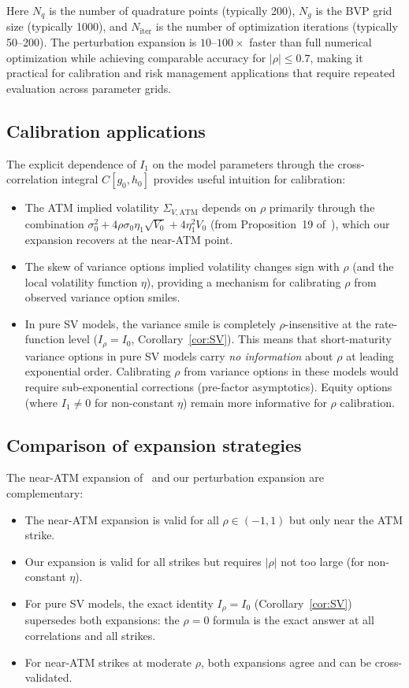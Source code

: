 \documentclass[11pt]{article}
\theoremstyle{definition}
\begin{document}
Here $N_q$ is the number of quadrature points (typically 200), $N_g$ is the BVP grid size (typically 1000), and $N_{\mathrm{iter}}$ is the number of optimization iterations (typically 50--200). The perturbation expansion is $10$--$100\times$ faster than full numerical optimization while achieving comparable accuracy for $|\rho| \leq 0.7$, making it practical for calibration and risk management applications that require repeated evaluation across parameter grids.

\subsection{Calibration applications}

The explicit dependence of $I_1$ on the model parameters through the cross-correlation integral $C[g_0, h_0]$ provides useful intuition for calibration:
\begin{itemize}
  \item The ATM implied volatility $\Sigma_{V,\mathrm{ATM}}$ depends on $\rho$ primarily through the combination $\sigma_0^2 + 4\rho\sigma_0\eta_1\sqrt{V_0} + 4\eta_1^2 V_0$ (from Proposition~19 of~\cite{PWZ2025}), which our expansion recovers at the near-ATM point.
  \item The skew of variance options implied volatility changes sign with $\rho$ (and the local volatility function $\eta$), providing a mechanism for calibrating $\rho$ from observed variance option smiles.
  \item In pure SV models, the variance smile is completely $\rho$-insensitive at the rate-function level ($I_\rho = I_0$, Corollary~\ref{cor:SV}). This means that short-maturity variance options in pure SV models carry \emph{no information} about $\rho$ at leading exponential order. Calibrating $\rho$ from variance options in these models would require sub-exponential corrections (pre-factor asymptotics). Equity options (where $I_1 \neq 0$ for non-constant $\eta$) remain more informative for $\rho$ calibration.
\end{itemize}

\subsection{Comparison of expansion strategies}

The near-ATM expansion of~\cite{PWZ2025} and our perturbation expansion are complementary:
\begin{itemize}
  \item The near-ATM expansion is valid for all $\rho \in (-1,1)$ but only near the ATM strike.
  \item Our expansion is valid for all strikes but requires $|\rho|$ not too large (for non-constant $\eta$).
  \item For pure SV models, the exact identity $I_\rho = I_0$ (Corollary~\ref{cor:SV}) supersedes both expansions: the $\rho=0$ formula is the exact answer at all correlations and all strikes.
  \item For near-ATM strikes at moderate $\rho$, both expansions agree and can be cross-validated.
\end{itemize}
\end{document}
